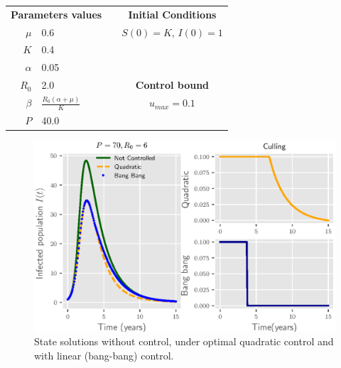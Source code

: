 \begin{table}
  \begin{center}
    \begin{tabular}{@{}rllc@{}}
      \toprule
      \multicolumn{2}{c}{\textbf{Parameters values}}
      &&
      \textbf{Initial Conditions}
      \\
      \cmidrule{1-2}
      \cmidrule{4-4}
      $\mu$
        & \num{0.6}
        &&  
          $S(0) = K$, 
          $I(0) = 1$
      \\
      $K$
        & \num{0.4}
      \\
      $\alpha$
        & \num{0.05}
      \\
      $R_0$
        & \num{2.0}
        && 
          \textbf{Control bound}
      \\
      \cmidrule{4-4}
      $\beta$
        &
         $
          \displaystyle
          \frac{R_0(\alpha + \mu)}{K}
         $
        &&
          $u_{max} = \num{0.1}$
      \\
      $P$
        & \num{40.0}
      \\
      \bottomrule
    \end{tabular}
  \end{center}
\end{table}





\begin{figure}[h]
  \centering
  \includegraphics{Figures/figure_1_culling}
  \caption{State solutions without control, under optimal quadratic control 
  and with linear (bang-bang) control.}
  \label{fig:figure1culling}
\end{figure}

